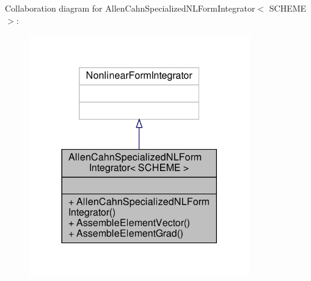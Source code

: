 Collaboration diagram for Allen\+Cahn\+Specialized\+N\+L\+Form\+Integrator$<$ S\+C\+H\+E\+ME $>$\+:\nopagebreak
\begin{figure}[H]
\begin{center}
\leavevmode
\includegraphics[width=270pt]{classAllenCahnSpecializedNLFormIntegrator__coll__graph}
\end{center}
\end{figure}
